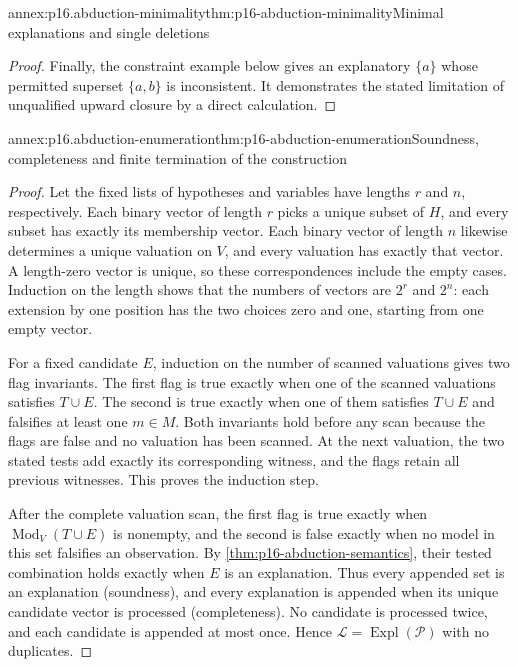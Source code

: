 \begin{annexitem}{annex:p16.abduction-minimality}{thm:p16-abduction-minimality}{Minimal explanations and single deletions}
\begin{proof}
Finally, the constraint example below gives an explanatory \(\{a\}\)
whose permitted superset \(\{a,b\}\) is inconsistent. It demonstrates
the stated limitation of unqualified upward closure by a direct calculation.
\end{proof}
\end{annexitem}

\begin{annexitem}{annex:p16.abduction-enumeration}{thm:p16-abduction-enumeration}{Soundness, completeness and finite termination of the construction}
\begin{proof}
Let the fixed lists of hypotheses and variables have lengths \(r\) and
\(n\), respectively. Each binary vector of length \(r\) picks a
unique subset of \(H\), and every subset has exactly its membership
vector. Each binary vector of length \(n\) likewise determines a unique
valuation on \(V\), and every valuation has exactly that vector. A
length-zero vector is unique, so these correspondences include the empty
cases. Induction on the length shows that the numbers of vectors are
\(2^r\) and \(2^n\): each extension by one position has the two
choices zero and one, starting from one empty vector.

For a fixed candidate \(E\), induction on the number of scanned
valuations gives two flag invariants. The first flag is true exactly when
one of the scanned valuations satisfies \(T\cup E\). The second is
true exactly when one of them satisfies \(T\cup E\) and falsifies
at least one \(m\in M\). Both invariants hold before any scan because
the flags are false and no valuation has been scanned. At the next
valuation, the two stated tests add exactly its corresponding witness, and
the flags retain all previous witnesses. This proves the induction step.

After the complete valuation scan, the first flag is true exactly when
\(\operatorname{Mod}_V(T\cup E)\) is nonempty, and the second is
false exactly when no model in this set falsifies an observation. By
\cref{thm:p16-abduction-semantics}, their tested combination holds exactly
when \(E\) is an explanation. Thus every appended set is an explanation
(soundness), and every explanation is appended when its unique candidate
vector is processed (completeness). No candidate is processed twice, and
each candidate is appended at most once. Hence
\(\mathcal L=\operatorname{Expl}(\mathcal P)\) with no duplicates.


\end{proof}
\end{annexitem}
